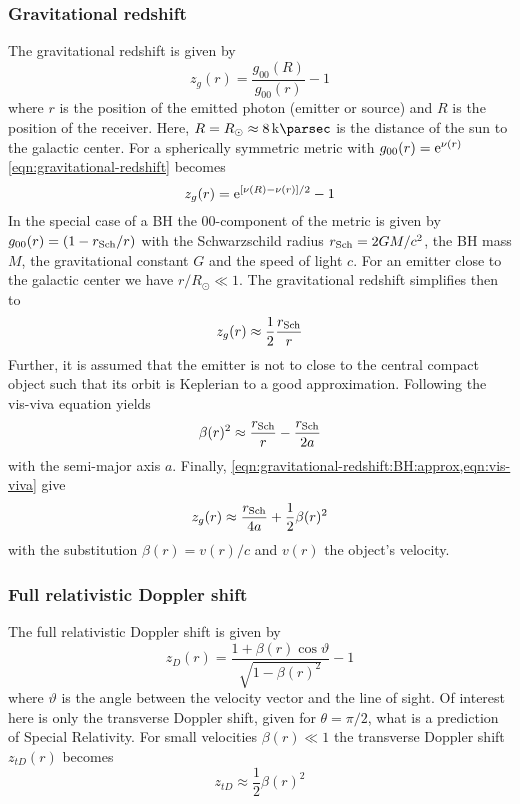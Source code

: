 \documentclass[nofootinbib,tightenlines,nobibnotes,aps,prl,preprint,groupedaddress]{revtex4-1}
\begin{document}
\subsubsection*{Gravitational redshift}
The gravitational redshift is given by \begin{equation}
	\label{eqn:gravitational-redshift}
	z_g(r) = \frac{g_{00}(R)}{g_{00}(r)} - 1
\end{equation} where $r$ is the position of the emitted photon (emitter or source) and $R$ is the position of the receiver. Here, $R = R_\odot \approx \SI{8}{\kilo\parsec}$ is the distance of the sun to the galactic center. For a spherically symmetric metric with $g_{00}(r) = \mathrm{e}^{\nu(r)}$ \cref{eqn:gravitational-redshift} becomes \begin{equation}
	z_g(r) = \mathrm{e}^{[\nu(R) - \nu(r)]/2} - 1
\end{equation} In the special case of a BH the $00$-component of the metric is given by $g_{00}(r) = (1 - r_{\rm Sch}/r)$ with the Schwarzschild radius $r_{\rm Sch} = 2 G M/c^2$, the BH mass $M$, the gravitational constant $G$ and the speed of light $c$. For an emitter close to the galactic center we have $r/R_\odot \ll 1$. The gravitational redshift simplifies then to \begin{equation}
	\label{eqn:gravitational-redshift:BH:approx}
	z_g(r) \approx \frac12 \frac{r_{\rm Sch}}{r}
\end{equation} Further, it is assumed that the emitter is not to close to the central compact object such that its orbit is Keplerian to a good approximation. Following the vis-viva equation yields \begin{equation}
	\label{eqn:vis-viva}
	\beta(r)^2 \approx \frac{r_{\rm Sch}}{r} - \frac{r_{\rm Sch}}{2 a}
\end{equation} with the semi-major axis $a$. Finally, \cref{eqn:gravitational-redshift:BH:approx,eqn:vis-viva} give \begin{equation}
	z_g(r) \approx \frac{r_{\rm Sch}}{4a} + \frac12 \beta(r)^2
\end{equation} with the substitution $\beta(r) = v(r)/c$ and $v(r)$ the object's velocity.

\subsubsection*{Full relativistic Doppler shift}
The full relativistic Doppler shift is given by \begin{equation}
	\label{eqn:Doppler-shift}
	z_D(r) = \frac{1 + \beta(r) \cos\vartheta}{\sqrt{1 - \beta(r)^2}} - 1
\end{equation} where $\vartheta$ is the angle between the velocity vector and the line of sight. Of interest here is only the transverse Doppler shift, given for $\theta=\pi/2$, what is a prediction of Special Relativity. For small velocities $\beta(r) \ll 1$ the transverse Doppler shift $z_{tD}(r)$ becomes \begin{equation}
	z_{tD} \approx \frac12 \beta(r)^2
\end{equation}
\end{document}
